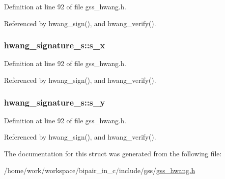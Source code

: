 Definition at line 92 of file gss\-\_\-hwang.\-h.



Referenced by hwang\-\_\-sign(), and hwang\-\_\-verify().

\hypertarget{structhwang__signature__s_aa90e1e307f33f573f6a5aa2a38297692}{
\subsubsection[{s\-\_\-x}]{ hwang\-\_\-signature\-\_\-s\-::s\-\_\-x}}\label{structhwang__signature__s_aa90e1e307f33f573f6a5aa2a38297692}


Definition at line 92 of file gss\-\_\-hwang.\-h.



Referenced by hwang\-\_\-sign(), and hwang\-\_\-verify().

\hypertarget{structhwang__signature__s_ae1cae695fcbda6e68a1cb7b87ba789e2}{
\subsubsection[{s\-\_\-y}]{ hwang\-\_\-signature\-\_\-s\-::s\-\_\-y}}\label{structhwang__signature__s_ae1cae695fcbda6e68a1cb7b87ba789e2}


Definition at line 92 of file gss\-\_\-hwang.\-h.



Referenced by hwang\-\_\-sign(), and hwang\-\_\-verify().



The documentation for this struct was generated from the following file\-:\begin{DoxyCompactItemize}
\item 
/home/work/workspace/bipair\-\_\-in\-\_\-c/include/gss/\hyperlink{gss__hwang_8h}{gss\-\_\-hwang.\-h}\end{DoxyCompactItemize}

